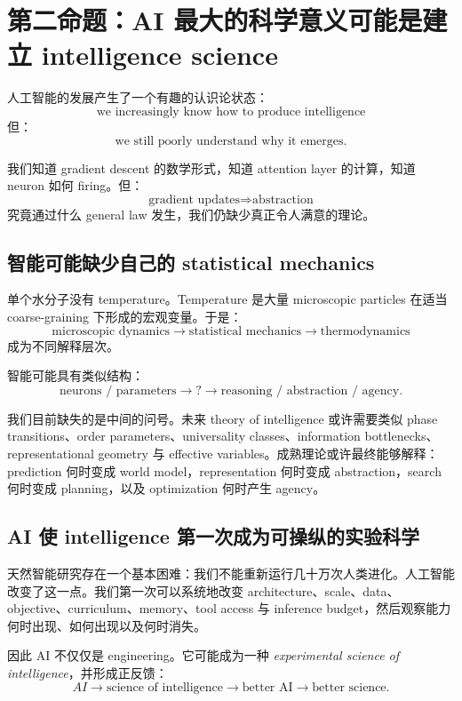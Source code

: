 \documentclass[11pt,letterpaper]{article}
\begin{document}
\section{第二命题：AI 最大的科学意义可能是建立 intelligence science}

人工智能的发展产生了一个有趣的认识论状态：
\[
\text{we increasingly know how to produce intelligence}
\]
但：
\[
\text{we still poorly understand why it emerges}.
\]

我们知道 gradient descent 的数学形式，知道 attention layer 的计算，知道 neuron 如何 firing。但：
\[
\text{gradient updates}\Rightarrow\text{abstraction}
\]
究竟通过什么 general law 发生，我们仍缺少真正令人满意的理论。

\subsection{智能可能缺少自己的 statistical mechanics}

单个水分子没有 temperature。Temperature 是大量 microscopic particles 在适当 coarse-graining 下形成的宏观变量。于是：
\[
\text{microscopic dynamics}
\rightarrow
\text{statistical mechanics}
\rightarrow
\text{thermodynamics}
\]
成为不同解释层次。

智能可能具有类似结构：
\[
\text{neurons / parameters}
\rightarrow
?
\rightarrow
\text{reasoning / abstraction / agency}.
\]

我们目前缺失的是中间的问号。未来 theory of intelligence 或许需要类似 phase transitions、order parameters、universality classes、information bottlenecks、representational geometry 与 effective variables。成熟理论或许最终能够解释：prediction 何时变成 world model，representation 何时变成 abstraction，search 何时变成 planning，以及 optimization 何时产生 agency。

\subsection{AI 使 intelligence 第一次成为可操纵的实验科学}

天然智能研究存在一个基本困难：我们不能重新运行几十万次人类进化。人工智能改变了这一点。我们第一次可以系统地改变 architecture、scale、data、objective、curriculum、memory、tool access 与 inference budget，然后观察能力何时出现、如何出现以及何时消失。

因此 AI 不仅仅是 engineering。它可能成为一种 \textit{experimental science of intelligence}，并形成正反馈：
\[
AI
\rightarrow
\text{science of intelligence}
\rightarrow
\text{better AI}
\rightarrow
\text{better science}.
\]
\end{document}
